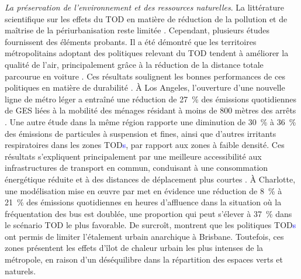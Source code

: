 \begin{refsegment}
\textsl{La préservation de l'environnement et des ressources naturelles}. La littérature scientifique sur les effets du \acrshort{TOD} en matière de réduction de la pollution et de maîtrise de la périurbanisation reste limitée \textcolor{blue}{\autocite[11]{ashik_investigating_2022}}. Cependant, plusieurs études fournissent des éléments probants. Il a été démontré que les territoires métropolitains adoptant des politiques relevant du \acrshort{TOD} tendent à améliorer la qualité de l’air, principalement grâce à la réduction de la distance totale parcourue en voiture \textcolor{blue}{\autocite[20]{gu_transit-oriented_2019}}. Ces résultats soulignent les bonnes performances de ces politiques en matière de durabilité \textcolor{blue}{\autocite[109]{choi_influence_2018}}. À Los Angeles, l’ouverture d’une nouvelle ligne de métro léger a entraîné une réduction de 27~\% des émissions quotidiennes de \acrshort{GES} liées à la mobilité des ménages résidant à moins de 800 mètres des arrêts \textcolor{blue}{\autocite[13]{boarnet_can_2017}}. Une autre étude dans la même région rapporte une diminution de 30~\% à 36~\% des émissions de particules à suspension et fines, ainsi que d'autres irritants respiratoires dans les zones \acrshort{TOD}\textcolor{blue}{s}, par rapport aux zones à faible densité. Ces résultats s’expliquent principalement par une meilleure accessibilité aux infrastructures de transport en commun, conduisant à une consommation énergétique réduite et à des distances de déplacement plus courtes \textcolor{blue}{\autocite[25]{nahlik_transit-oriented_2014}}. À Charlotte, une modélisation mise en œuvre par \textcolor{blue}{\textcite[4]{hosseini_understanding_2024}} met en évidence une réduction de 8~\% à 21~\% des émissions quotidiennes en heures d'affluence dans la situation où la fréquentation des bus est doublée, une proportion qui peut s'élever à 37~\% dans le scénario \acrshort{TOD} le plus favorable. De surcroît, \textcolor{blue}{\textcite[120]{kamruzzaman_investigating_2018}} montrent que les politiques \acrshort{TOD}\textcolor{blue}{s} ont permis de limiter l’étalement urbain anarchique à Brisbane. Toutefois, ces zones présentent les effets d'îlot de chaleur urbain les plus intenses de la métropole, en raison d’un déséquilibre dans la répartition des espaces verts et naturels.%


\end{refsegment}
